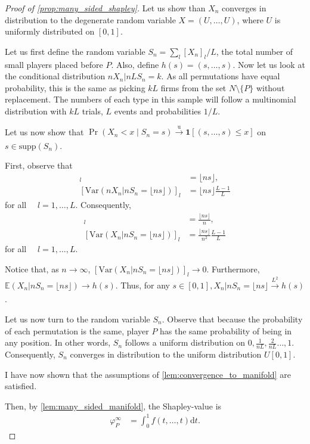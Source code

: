 \documentclass[a4paper]{article}
\newcommand{\dt}{\mathrm{d}t}
\newcommand{\E}{\mathbb{E}}
\newcommand{\Var}{\mathrm{Var}}
\begin{document}
\begin{proof}[Proof of \cref{prop:many_sided_shapley}]
    Let us show than $X_n$ converges in distribution to the degenerate random variable $X = (U, \dots, U)$, where $U$ is uniformly distributed on $[0, 1]$.

    Let us first define the random variable $S_n = \sum_l[X_n]_l / L$, the total number of small players placed before $P$.
    Also, define $h(s) = (s, \dots, s)$.
    Now let us look at the conditional distribution $n X_n | n L S_n = k$.
    As all permutations have equal probability, this is the same as picking $kL$ firms from the set $N \setminus \{P\}$ without replacement.
    The numbers of each type in this sample will follow a multinomial distribution with $kL$ trials, $L$ events and probabilities $1/L$.

    Let us now show that $\Pr(X_n < x \mid S_n = s) \xrightarrow[]{\mathrm{u}} \mathbf{1}[(s, \dots, s) \leq x]$ on $s \in \mathrm{supp}(S_n)$.

    First, observe that
    \begin{align*}
        [\E(n X_n | nS_n = \lfloor ns \rfloor)]_l &= \lfloor ns \rfloor, \\
        [\Var(n X_n | nS_n = \lfloor ns \rfloor)]_l &= \lfloor ns \rfloor \frac{L-1}{L}
    \end{align*}
    for all $\quad l = 1, \dots, L$.
    Consequently,
    \begin{align*}
        [\E(X_n | nS_n = \lfloor ns \rfloor)]_l &= \frac{\lfloor ns \rfloor}{n}, \\
        [\Var(X_n | nS_n = \lfloor ns \rfloor)]_l &= \frac{\lfloor ns \rfloor}{n^2} \frac{L-1}{L}
    \end{align*}
    for all $\quad l = 1, \dots, L$.

    Notice that, as $n \to \infty$, $[\Var(X_n | nS_n = \lfloor ns \rfloor)]_l \to 0$.
    Furthermore, $\E(X_n | nS_n = \lfloor ns \rfloor) \to h(s)$.
    Thus, for any $s \in [0, 1], X_n | nS_n = \lfloor ns \rfloor \xrightarrow[]{L^2} h(s)$.

    Let us now turn to the random variable $S_n$.
    Observe that because the probability of each permutation is the same, player $P$ has the same probability of being in any position.
    In other words, $S_n$ follows a uniform distribution on $0, \frac{1}{nL}, \frac{2}{nL} \dots, 1$.
    Consequently, $S_n$ converges in distribution to the uniform distribution $U[0, 1]$.

    I have now shown that the assumptions of \cref{lem:convergence_to_manifold} are satisfied.

    Then, by \cref{lem:many_sided_manifold}, the Shapley-value is
    \begin{align*}
        \varphi_P^\infty & = \int_0^1 f(t, \dots, t) \dt.
    \end{align*}

\end{proof}
\end{document}
